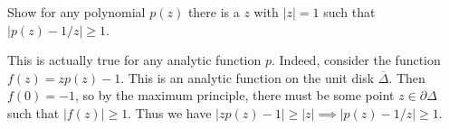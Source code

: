 \documentclass{pset}
\begin{document}
\begin{parts}

\end{parts}

\begin{problem}{14}
    Show for any polynomial $p(z)$ there is a $z$ with $|z|=1$ such that $|p(z)-1 /z|\geq 1$.
\end{problem}

\begin{solution}
    This is actually true for any analytic function $p$. Indeed, consider the function $f(z)=zp(z)-1$. This is an analytic function on the unit disk $\overline{\Delta}$. Then $f(0)=-1$, so by the maximum principle, there must be some point $z\in \partial \Delta$ such that $|f(z)| \geq 1$. Thus we have $|zp(z)-1| \geq |z| \implies |p(z) - 1/z| \geq 1$.
\end{solution}

\collaborators
\end{document}
